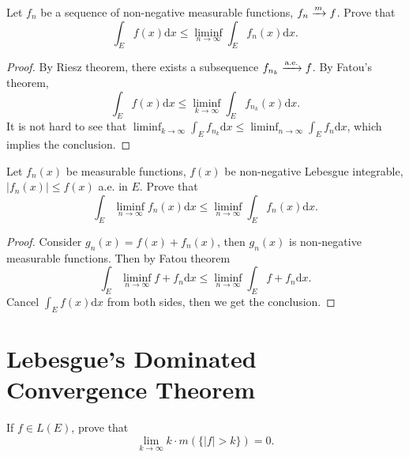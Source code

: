\begin{exercise}{}{}
  Let $f_n$ be a sequence of non-negative measurable functions,
  $f_n \xrightarrow{m} f$. Prove that
  \begin{equation}
    \int_E f(x) \mathrm{d} x \leq \liminf _{n \rightarrow \infty} \int_E f_n(x)\mathrm{d} x.
  \end{equation}
\end{exercise}

\begin{proof}
  By Riesz theorem, there exists a subsequence $f_{n_k} \xrightarrow{\text{a.e.}} f$.
  By Fatou's theorem,
  \begin{equation}
    \int_E f(x)\mathrm{d} x \leq \liminf_{k \rightarrow \infty} \int_E f_{n_k}(x)\mathrm{d} x.
  \end{equation}
  It is not hard to see that
  $\liminf_{k \rightarrow \infty} \int_E f_{n_k}\mathrm{d} x \leq \liminf_{n \rightarrow \infty} \int_E f_n \mathrm{d} x$,
  which implies the conclusion.
\end{proof}

\begin{exercise}{}{}
  Let $f_n(x)$ be measurable functions, $f(x)$ be non-negative Lebesgue integrable,
  $|f_n(x)| \leq f(x)$ a.e. in $E$. Prove that
  \begin{equation}
    \int_E \liminf_{n \rightarrow \infty} f_n(x) \mathrm{d} x \leq \liminf _{n \rightarrow \infty} \int_E f_n(x)\mathrm{d} x.
  \end{equation}
\end{exercise}

\begin{proof}
  Consider $g_n(x) = f(x) + f_n(x)$, then $g_n(x)$ is non-negative measurable functions.
  Then by Fatou theorem
  \begin{equation}
    \int_E \liminf_{n \rightarrow \infty} f + f_n \mathrm{d} x
    \leq \liminf_{n \rightarrow \infty} \int_E f + f_n \mathrm{d} x.
  \end{equation}
  Cancel $\int_E f(x)\mathrm{d} x$ from both sides, then we get the conclusion.
\end{proof}



\section{Lebesgue's Dominated Convergence Theorem}

\begin{exercise}{}{}
  If $f \in L(E)$, prove that
  \begin{equation}
    \lim \limits _{k \rightarrow \infty} k \cdot m(\{|f| > k\}) = 0.
  \end{equation}
\end{exercise}

